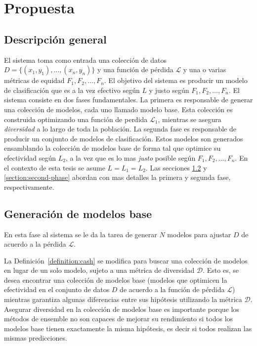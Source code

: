\chapter{Propuesta}\label{chapter:proposal}


\section{Descripción general}\label{section:overview}

El sistema toma como entrada una colección de datos $D = \{(x_1, y_1), \dots , (x_n, y_n)\}$ y una función de pérdida $\mathcal{L}$ y una o varias métricas de equidad $F_1, F_2, \dots, F_n$.
El objetivo del sistema es producir un modelo de clasificación que es a la vez efectivo según $L$ y justo según $F_1, F_2, \dots, F_n$.
El sistema consiste en dos fases fundamentales.
La primera es responsable de generar una colección de modelos, cada uno llamado modelo base.
Esta colección es construida optimizando una función de perdida $\mathcal{L}_1$, mientras se asegura \emph{diversidad} a lo largo de toda la población.
La segunda fase es responsable de producir un conjunto de modelos de clasificación.
Estos modelos son generados ensamblando la colección de modelos base de forma tal que optimice su efectividad según $L_2$, a la vez que es lo mas \emph{justo} posible según $F_1, F_2, \dots, F_n$.
En el contexto de esta tesis se asume $L = L_1 = L_2$.
Las secciones \ref{section:first-phase} y \ref{section:second-phase} abordan con mas detalles la primera y segunda fase, respectivamente.



\section{Generación de modelos base}\label{section:first-phase}


En esta fase al sistema se le da la tarea de generar $N$ modelos para ajustar $D$ de acuerdo a la pérdida $\mathcal{L}$.

La Definición~\ref{definition:cash} se modifica para buscar una colección de modelos en lugar de un solo modelo, sujeto a una métrica de diversidad $\mathcal{D}$.
Esto es, se desea encontrar una colección de modelos base (modelos que optimicen la efectividad en el conjunto de datos $D$ de acuerdo a la función de pérdida $\mathcal{L}$) mientras garantiza algunas diferencias entre sus hipótesis utilizando la métrica $\mathcal{D}$.
Asegurar diversidad en la colección de modelos base es importante porque los métodos de ensemble no son capaces de mejorar su rendimiento si todos los modelos base tienen exactamente la misma hipótesis, es decir si todos realizan las mismas predicciones.

